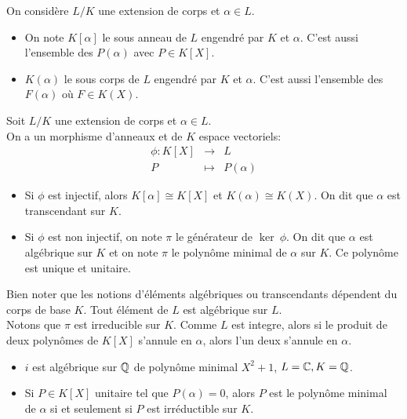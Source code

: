 \begin{definition}
	On considère $L/K$ une extension de corps et $\alpha \in L$. \\
	\begin{itemize}
		\item On note $K[\alpha]$ le sous anneau de $L$ engendré par $K$ et $\alpha$. C'est aussi l'ensemble des $P(\alpha)$ avec $P \in K[X]$.
		\item $K(\alpha)$ le sous corps de $L$ engendré par $K$ et $\alpha$. C'est aussi l'ensemble des $F(\alpha)$ où $F \in K(X)$.
	\end{itemize}
\end{definition}


\begin{definition}
	Soit $L/K$ une extension de corps et $\alpha \in L$.\\
	On a un morphisme d'anneaux et de $K$ espace vectoriels:
	\begin{eqnarray*}
		\phi: K[X] &\to& L \\
		P &\mapsto& P(\alpha)
	\end{eqnarray*}
	\begin{itemize}
		\item Si $\phi$ est injectif, alors $K[\alpha] \cong K[X]$ et $K(\alpha) \cong K(X)$. On dit que $\alpha$ est transcendant sur $K$.
		\item Si $\phi$ est non injectif, on note $\pi$ le générateur de $\ker\ \phi$. On dit que $\alpha$ est algébrique sur $K$ et on note $\pi$ le polynôme minimal de
		      $\alpha$ sur $K$. Ce polynôme est unique et unitaire.
	\end{itemize}
\end{definition}

\begin{remarque}
	Bien noter que les notions d'éléments algébriques ou transcendants dépendent du corps de base $K$. Tout élément de $L$ est algébrique sur $L$.\\
	Notons que $\pi$ est irreducible sur $K$. Comme $L$ est integre, alors si le produit de deux polynômes de $K[X]$ s'annule en $\alpha$, alors l'un deux s'annule en $\alpha$.
\end{remarque}

\begin{example}
	\begin{itemize}
		\item $i$ est algébrique sur $\mathbb{Q}$ de polynôme minimal $X^2+1$, $L = \mathbb{C}, K = \mathbb{Q}$.
		\item Si $P \in K[X]$ unitaire tel que $P(\alpha) = 0$, alors $P$ est le polynôme minimal de $\alpha$ si et seulement si $P$ est irréductible sur $K$.
	\end{itemize}
\end{example}

